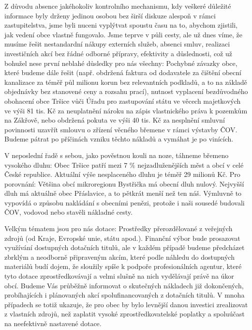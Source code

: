 \documentclass[10pt]{article}
\begin{document}
\begin{multicols}{2}
{Z důvodu absence jakéhokoliv kontrolního mechanismu, kdy veškeré důležité informace byly drženy jedinou osobou bez širší diskuze alespoň v rámci zastupitelstva, jsme byli nuceni vyplýtvat spoustu času na to, abychom zjistili, jak vedení obce vlastně fungovalo. Jsme teprve v půli cesty, ale už dnes víme, že musíme řešit nestandardní nákupy externích služeb, absenci smluv, realizaci investičních akcí bez řádné odborné přípravy, efektivity a důslednosti, což už bohužel nese první neblahé důsledky pro nás všechny: Pochybné závazky obce, které budeme dále řešit (např. obdržená faktura od dodavatele za čištění obecní kanalizace za téměř půl milionu korun bez relevantních podkladů, a to na základě objednávky bez stanovené ceny a rozsahu prací), nutnost vyplacení bezdůvodného obohacení obce Tršice vůči Úřadu pro zastupování státu ve věcech majetkových ve výši 81 tis. Kč za neuplatnění nároku na zápis vlastnického práva k pozemkům na Zákřově, nebo obdržená pokuta ve výši 40 tis. Kč za nesplnění smluvní povinnosti uzavřít smlouvu o zřízení věcného břemene v rámci výstavby ČOV. Budeme pátrat po příčinách vzniku těchto nákladů a vymáhat je po vinících.

V neposlední řadě s sebou, jako pověstnou kouli na noze, táhneme břemeno vysokého dluhu: Obec Tršice patří mezi 7 \% nejzadluženějších měst a obcí v celé České republice. Aktuální výše nesplaceného dluhu je téměř 29 milionů Kč. Pro porovnání: Většina obcí mikroregionu Bystřička má obecní dluh nulový. Nejvyšší dluh má aktuálně obec Přáslavice, a to pětkrát menší než ten náš. Výmluvně to vypovídá o způsobu nakládání s obecními penězi, protože i naši sousedé budovali ČOV, vodovod nebo stavěli nákladné cesty.

Velkým tématem jsou pro nás dotace: Prostředky přerozdělované z veřejných zdrojů (od Kraje, Evropské unie, státu apod.). Finanční výbor bude prosazovat využívání dostupných dotačních titulů, ale v každém případě budeme předcházet zbrklým a neodborně připraveným akcím, které podle náhledu do dostupných materiálů budí dojem, že sloužily spíše k podpoře profesionálních agentur, které tyto dotace zprostředkovávají a velmi slušně na nich vydělávají právě na úkor obcí. Budeme Vás průběžně informovat o skutečných nákladech již dokončených, probíhajících i plánovaných akcí spolufinancovaných z dotačních titulů. V mnoha případech se totiž ukazuje, že pro obec by bylo levnější danou investici zrealizovat z vlastních zdrojů, než zaplatit vysoké zprostředkovatelské poplatky a spoluúčast na neefektivně nastavené dotace.

}
\end{multicols}
\end{document}

